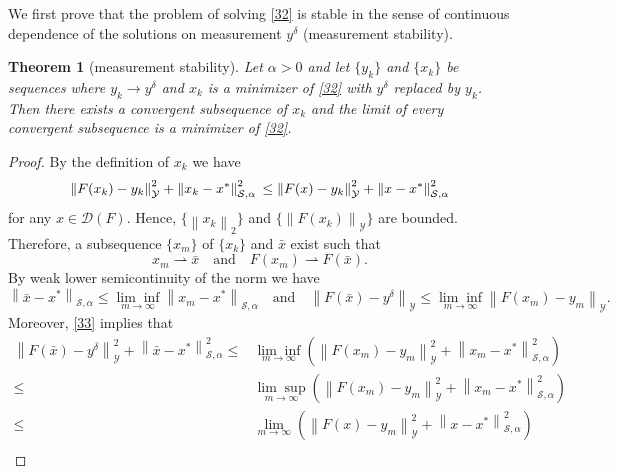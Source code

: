 \documentclass[11pt]{article}
\newtheorem{theorem}{Theorem}[section]
\begin{document}
We first prove that the problem of solving \eqref{32} is stable in the sense of continuous dependence of the solutions on measurement $ y^\delta $ (measurement stability).
\begin{theorem}[measurement stability]\label{thm51}
Let $ \alpha>0 $ and let $ \{y_k\} $ and $ \{x_k\} $ be sequences where $ y_k\to y^\delta $ and $ x_k $ is a minimizer of \eqref{32} with $ y^\delta $ replaced by $ y_k $. Then there exists a convergent subsequence of $ x_k $ and the limit of every convergent subsequence is a minimizer of \eqref{32}.
\end{theorem}
\begin{proof}
By the definition of $ x_k $ we have
\begin{equation}\label{33}
\left\|F(x_k) - y_k\right\|^2_\mathcal{Y} + \left\|x_k - x^*\right\|_{\mathcal{S}, \alpha}^2\\
\leq 
\left\|F(x) - y_k\right\|^2_\mathcal{Y} + \left\|x - x^*\right\|_{\mathcal{S}, \alpha}^2
\end{equation}
for any $ x\in \mathcal{D}(F) $. Hence, $ \{\left\|x_k\right\|_2\} $ and $ \{\left\|F(x_k)\right\|_\mathcal{Y}\} $ are bounded. Therefore, a subsequence $ \{x_m\} $ of $ \{x_k\} $ and $\bar{x}$ exist such that
\begin{displaymath}
x_m\rightharpoonup\bar{x}\quad \mathrm{and}\quad F(x_m)\rightharpoonup F(\bar{x}).
\end{displaymath}
By weak lower semicontinuity of the norm we have
\begin{equation}\label{34}
\left\|\bar{x} - x^*\right\|_{\mathcal{S}, \alpha}\leq \underset{m\to \infty}{\lim\inf}\left\|x_m - x^*\right\|_{\mathcal{S}, \alpha}
\quad \mathrm{and}\quad
\left\|F(\bar{x}) - y^\delta\right\|_\mathcal{Y}\leq \underset{m\to \infty}{\lim\inf}\left\|F(x_m) - y_m\right\|_\mathcal{Y}.
\end{equation}
Moreover, \eqref{33} implies that
\begin{displaymath}
\begin{aligned}
\left\|F(\bar{x}) - y^\delta\right\|^2_\mathcal{Y} + \left\|\bar{x} - x^*\right\|_{\mathcal{S}, \alpha}^2
\leq 
&\underset{m\to \infty}{\lim\inf}\left(\left\|F(x_m) - y_m\right\|^2_\mathcal{Y} + \left\|x_m - x^*\right\|_{\mathcal{S}, \alpha}^2\right)\\
\leq 
&\underset{m\to \infty}{\lim\sup}\left(\left\|F(x_m) - y_m\right\|^2_\mathcal{Y} + \left\|x_m - x^*\right\|_{\mathcal{S}, \alpha}^2\right)\\
\leq
&\lim_{m\to\infty}\left(\left\|F(x) - y_m\right\|^2_\mathcal{Y} + \left\|x - x^*\right\|_{\mathcal{S}, \alpha}^2\right)\\

\end{aligned}
\end{displaymath}
\end{proof}
\end{document}

